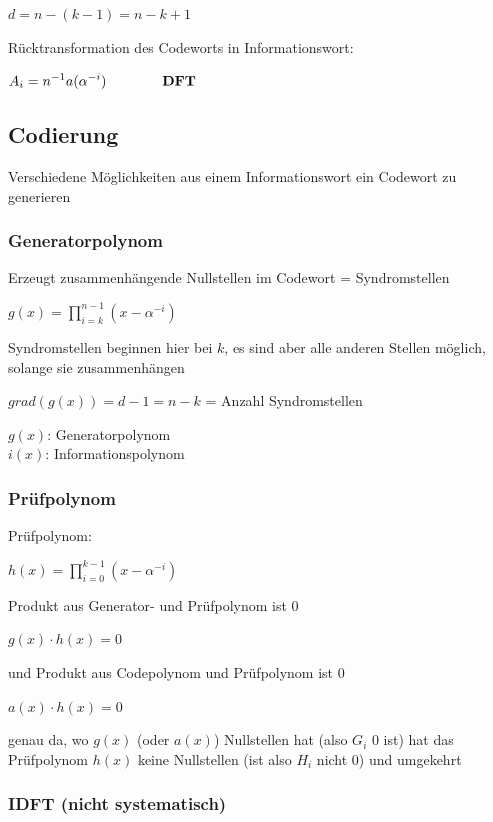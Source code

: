 $d = n - (k - 1) = n - k + 1$

Rücktransformation des Codeworts in Informationswort:

$\displaystyle{
    A_i = n^{-1} a(\alpha^{-i}) \qquad\qquad \text{\textbf{DFT}}
}$

\subsection{Codierung}

Verschiedene Möglichkeiten aus einem Informationswort ein Codewort zu generieren

\subsubsection{Generatorpolynom}
\label{subsubsec:gen-poly}

Erzeugt zusammenhängende Nullstellen im Codewort = Syndromstellen

$\displaystyle{
    g(x) = \prod_{i=k}^{n-1} \left(x - \alpha^{-i}\right)
}$

Syndromstellen beginnen hier bei $k$, es sind aber alle anderen Stellen möglich, solange sie zusammenhängen

$grad(g(x)) = d-1 = n-k$ = Anzahl Syndromstellen

$g(x)$: Generatorpolynom\\
$i(x)$: Informationspolynom

\subsubsection{Prüfpolynom}

Prüfpolynom:

$\displaystyle{
    h(x) = \prod_{i=0}^{k-1} \left(x - \alpha^{-i}\right)
}$

Produkt aus Generator- und Prüfpolynom ist 0

$\displaystyle{
    g(x) \cdot h(x) = 0
}$

und Produkt aus Codepolynom und Prüfpolynom ist 0

$\displaystyle{
    a(x) \cdot h(x) = 0
}$

genau da, wo $g(x)$ (oder $a(x)$) Nullstellen hat (also $G_i$ 0 ist) hat das Prüfpolynom $h(x)$ keine Nullstellen
(ist also $H_i$ nicht 0) und umgekehrt

\subsubsection{IDFT (nicht systematisch)}


